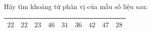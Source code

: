 \begin{ex}
Hãy tìm khoảng tứ phân vị của mẫu số liệu sau:
\begin{center}
\begin{tabular}{|c|c|c|c|c|c|c|c|c|}\hline
$22$ & $22$ & $23$ & $46$ & $31$ & $36$ & $42$ & $47$ & $28$\\\hline
\end{tabular}
\end{center}
\end{ex}
